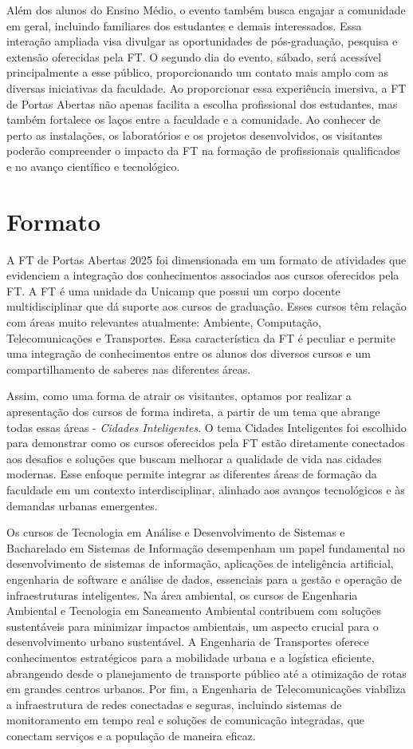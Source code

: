 \documentclass[
  letterpaper,
  DIV=11,
  numbers=noendperiod]{scrreprt}
\begin{document}
Além dos alunos do Ensino Médio, o evento também busca engajar a
comunidade em geral, incluindo familiares dos estudantes e demais
interessados. Essa interação ampliada visa divulgar as oportunidades de
pós-graduação, pesquisa e extensão oferecidas pela FT. O segundo dia do
evento, sábado, será acessível principalmente a esse público,
proporcionando um contato mais amplo com as diversas iniciativas da
faculdade. Ao proporcionar essa experiência imersiva, a FT de Portas
Abertas não apenas facilita a escolha profissional dos estudantes, mas
também fortalece os laços entre a faculdade e a comunidade. Ao conhecer
de perto as instalações, os laboratórios e os projetos desenvolvidos, os
visitantes poderão compreender o impacto da FT na formação de
profissionais qualificados e no avanço científico e tecnológico.

\chapter{Formato}\label{formato}

A FT de Portas Abertas 2025 foi dimensionada em um formato de atividades
que evidenciem a integração dos conhecimentos associados aos cursos
oferecidos pela FT. A FT é uma unidade da Unicamp que possui um corpo
docente multidisciplinar que dá suporte aos cursos de graduação. Esses
cursos têm relação com áreas muito relevantes atualmente: Ambiente,
Computação, Telecomunicações e Transportes. Essa característica da FT é
peculiar e permite uma integração de conhecimentos entre os alunos dos
diversos cursos e um compartilhamento de saberes nas diferentes áreas.

Assim, como uma forma de atrair os visitantes, optamos por realizar a
apresentação dos cursos de forma indireta, a partir de um tema que
abrange todas essas áreas - \emph{Cidades Inteligentes}. O tema Cidades
Inteligentes foi escolhido para demonstrar como os cursos oferecidos
pela FT estão diretamente conectados aos desafios e soluções que buscam
melhorar a qualidade de vida nas cidades modernas. Esse enfoque permite
integrar as diferentes áreas de formação da faculdade em um contexto
interdisciplinar, alinhado aos avanços tecnológicos e às demandas
urbanas emergentes.

Os cursos de Tecnologia em Análise e Desenvolvimento de Sistemas e
Bacharelado em Sistemas de Informação desempenham um papel fundamental
no desenvolvimento de sistemas de informação, aplicações de inteligência
artificial, engenharia de software e análise de dados, essenciais para a
gestão e operação de infraestruturas inteligentes. Na área ambiental, os
cursos de Engenharia Ambiental e Tecnologia em Saneamento Ambiental
contribuem com soluções sustentáveis para minimizar impactos ambientais,
um aspecto crucial para o desenvolvimento urbano sustentável. A
Engenharia de Transportes oferece conhecimentos estratégicos para a
mobilidade urbana e a logística eficiente, abrangendo desde o
planejamento de transporte público até a otimização de rotas em grandes
centros urbanos. Por fim, a Engenharia de Telecomunicações viabiliza a
infraestrutura de redes conectadas e seguras, incluindo sistemas de
monitoramento em tempo real e soluções de comunicação integradas, que
conectam serviços e a população de maneira eficaz.
\end{document}

